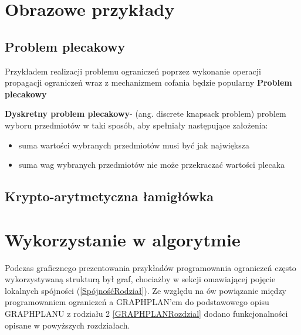 \section{Obrazowe przykłady}
    \subsection{Problem plecakowy}
    Przykładem realizacji problemu ograniczeń poprzez wykonanie operacji propagacji ograniczeń wraz z mechanizmem cofania będzie popularny \textbf{Problem plecakowy}
    \begin{example}
        \textbf{Dyskretny problem plecakowy}- (ang. discrete knapsack problem) problem wyboru przedmiotów w taki sposób, aby spełniały następujące założenia:
        \begin{itemize}
            \item suma wartości wybranych przedmiotów musi być jak największa 
            \item suma wag wybranych przedmiotów nie może przekraczać wartości plecaka
        \end{itemize}

    \subsection{Krypto-arytmetyczna łamigłówka}



    \end{example}

\section{Wykorzystanie w algorytmie}

    Podczas graficznego prezentowania przykładów programowania ograniczeń często wykorzystywaną strukturą był graf, chociażby w sekcji omawiającej 
    pojęcie lokalnych spójności (\ref{SpójnośćRodział}). Ze względu na ów powiązanie między programowaniem ograniczeń a GRAPHPLAN'em do podstawowego opisu GRAPHPLANU z rodziału 2 
    \ref{GRAPHPLANRozdzial} dodano funkcjonalności opisane w powyższych rozdziałach. 

